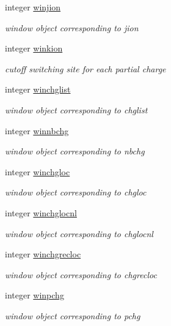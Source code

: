 \begin{DoxyCompactItemize}
integer \hyperlink{classcharge_a8faac0f42a8281206457a781be89d809}{winjion}
\begin{DoxyCompactList}\small\item\em window object corresponding to jion \end{DoxyCompactList}\item 
integer \hyperlink{classcharge_a54101485f254fd685c6f6d2ca96cfe86}{winkion}
\begin{DoxyCompactList}\small\item\em cutoff switching site for each partial charge \end{DoxyCompactList}\item 
integer \hyperlink{classcharge_aec7304bdb32da675589efb079cc02942}{winchglist}
\begin{DoxyCompactList}\small\item\em window object corresponding to chglist \end{DoxyCompactList}\item 
integer \hyperlink{classcharge_aeb8f3f6cb0def0ec0d81b6140b5042e6}{winnbchg}
\begin{DoxyCompactList}\small\item\em window object corresponding to nbchg \end{DoxyCompactList}\item 
integer \hyperlink{classcharge_affdd1b084d1cf6c440913d7428e91151}{winchgloc}
\begin{DoxyCompactList}\small\item\em window object corresponding to chgloc \end{DoxyCompactList}\item 
integer \hyperlink{classcharge_a1df5f2b5c1339473ca4cfc6d80f6272d}{winchglocnl}
\begin{DoxyCompactList}\small\item\em window object corresponding to chglocnl \end{DoxyCompactList}\item 
integer \hyperlink{classcharge_a7c092558e98218116613e7117e819534}{winchgrecloc}
\begin{DoxyCompactList}\small\item\em window object corresponding to chgrecloc \end{DoxyCompactList}\item 
integer \hyperlink{classcharge_a9d412813e3be3dba41d38953d88afa3a}{winpchg}
\begin{DoxyCompactList}\small\item\em window object corresponding to pchg \end{DoxyCompactList}\item 

\end{DoxyCompactItemize}

